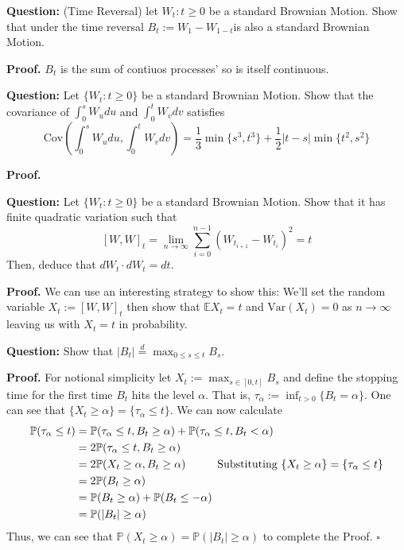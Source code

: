 \documentclass{article}
\begin{document}
\begin{tcolorbox}[colframe=black,colback=gray!5,boxrule=0.5pt]
\textbf{Question:} (Time Reversal) let $W_t: t\geq0$ be a standard Brownian Motion. Show that under the time reversal $B_t := W_1 - W_{1-t}$is also a standard Brownian Motion.
\end{tcolorbox}
\textbf{Proof.} $B_t$ is the sum of contiuos processes' so is itself continuous. 

\begin{tcolorbox}[colframe=black,colback=gray!5,boxrule=0.5pt]
\textbf{Question:} Let $\{W_t : t\geq0 \}$ be a standard Brownian Motion. Show that the covariance of $\int_0^s W_udu$ and $\int_0^t W_vdv$ satisfies
$$\text{Cov}\left(\int_0^s W_udu, \int_0^t W_vdv\right) = \frac{1}{3}\min\{s^3, t^3\} + \frac{1}{2}|t-s|\min\{t^2, s^2\}$$
\end{tcolorbox}
\textbf{Proof.}

\begin{tcolorbox}[colframe=black,colback=gray!5,boxrule=0.5pt]
\textbf{Question:} Let $\{W_t : t\geq0 \}$ be a standard Brownian Motion. Show that it has finite quadratic variation such that 
$$[W,W]_t = \lim_{n\to\infty}\sum_{i=0}^{n-1}(W_{t_{i+1}} - W_{t_i})^2 = t$$
Then, deduce that $dW_t\cdot dW_t = dt.$
\end{tcolorbox}
\textbf{Proof.} We can use an interesting strategy to show this: We'll set the random variable $X_t := [W,W]_t$ then show that $\mathbb{E}X_t = t$ and $\text{Var}(X_t)=0$ as $n\to\infty$ leaving us with $X_t=t$ in probability.



\begin{tcolorbox}[colframe=black,colback=gray!5,boxrule=0.5pt]
\textbf{Question:} Show that $|B_t| \stackrel{d}{=} \max_{0\leq s\leq t} B_s$.
\end{tcolorbox}
\textbf{Proof.} For notional simplicity let $X_t := \max_{s\in[0,t]} B_s$ and define the stopping time for the first time $B_t$ hits the level $\alpha$. That is, $\tau_\alpha := \inf_{t>0}\{B_t = \alpha\}$. One can see that $\{X_t\geq\alpha\} = \{\tau_\alpha \leq t\}$. We can now calculate
\begin{align*}
    \mathbb{P}(\tau_\alpha \leq t) &= \mathbb{P}(\tau_\alpha\leq t, B_t \geq \alpha) + \mathbb{P}(\tau_\alpha\leq t, B_t < \alpha) \\
    &= 2\mathbb{P}(\tau_\alpha\leq t, B_t \geq \alpha) \\
    &= 2\mathbb{P}(X_t\geq \alpha, B_t\geq \alpha) \hspace{10mm}\text{{Substituting $\{X_t\geq\alpha\} = \{\tau_\alpha \leq t\}$}} \\
    &= 2\mathbb{P}(B_t\geq \alpha) \\
    &= \mathbb{P}(B_t\geq \alpha) + \mathbb{P}(B_t\leq -\alpha) \\
    &=\mathbb{P}(|B_t|\geq\alpha)
\end{align*}
Thus, we can see that $\mathbb{P}(X_t\geq\alpha) = \mathbb{P}(|B_t|\geq\alpha)$ to complete the Proof. $\square$
\end{document}
